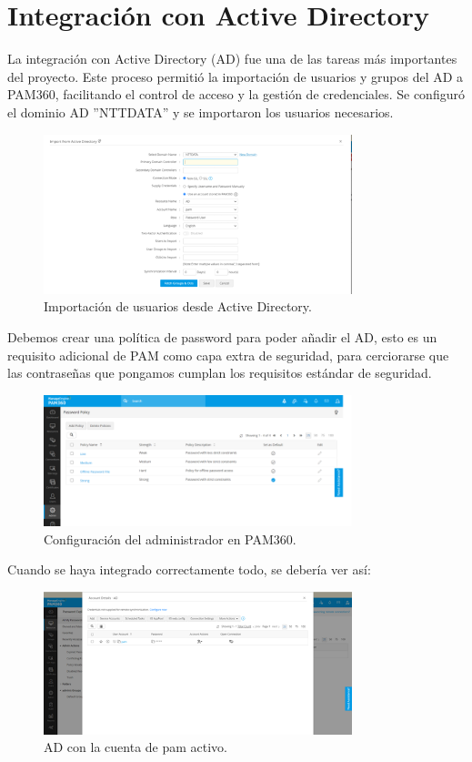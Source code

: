\section{Integración con Active Directory}
La integración con Active Directory (AD) fue una de las tareas más importantes del proyecto. Este proceso permitió la importación de usuarios y grupos del AD a PAM360, facilitando el control de acceso y la gestión de credenciales. Se configuró el dominio AD ''NTTDATA'' y se importaron los usuarios necesarios.

\begin{figure}[H]
	\centering
	\includegraphics[width=0.8\textwidth]{./img/pam_ad3.png}
	\caption{Importación de usuarios desde Active Directory.}
	\label{fig:pam_ad3}
\end{figure}

Debemos crear una política de password para poder añadir el AD, esto es un requisito adicional de PAM como capa extra de seguridad, para cerciorarse que las contraseñas que pongamos cumplan los requisitos estándar de seguridad.

\begin{figure}[H]
	\centering
	\includegraphics[width=0.8\textwidth]{./img/pam_password_policy.png}
	\caption{Configuración del administrador en PAM360.}
	\label{fig:pam_password_policy}
\end{figure}

Cuando se haya integrado correctamente todo, se debería ver así:

\begin{figure}[H]
	\centering
	\includegraphics[width=0.8\textwidth]{./img/pam_integradoya_ad.png}
	\caption{AD con la cuenta de pam activo.}
	\label{fig:pam_ad4}
\end{figure}

